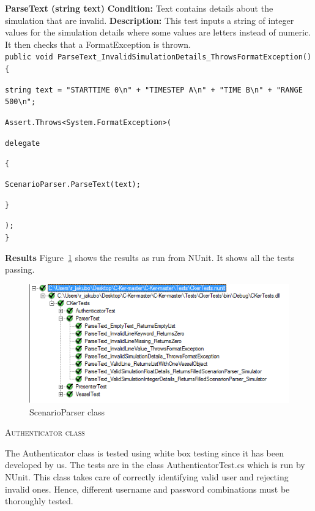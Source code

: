 \documentclass[12pt]{article}
\begin{document}
\clearpage

{\bfseries ParseText (string text)} \newline
{\bfseries Condition:} Text contains details about the simulation that are invalid. \newline
{\bfseries Description:} This test inputs a string of integer values for the simulation details where some values are letters instead of numeric. It then checks that a FormatException is thrown.\\

\texttt{public void ParseText\_InvalidSimulationDetails\_ThrowsFormatException()}\\
\texttt{\{}\par
\texttt{string text = "STARTTIME 0\textbackslash n" + "TIMESTEP A\textbackslash n" + "TIME B\textbackslash n" + "RANGE 500\textbackslash n";}\par
\texttt{Assert.Throws<System.FormatException>(}\par
\texttt{delegate}\par     
\texttt{\{}\par
\texttt{ScenarioParser.ParseText(text);}\par
\texttt{\}}\par
\texttt{);}\\
\texttt{\}}\par

\clearpage

{\bfseries Results} \newline
Figure~\ref{fig:ScenarioParser class} shows the results as run from NUnit. It shows all the tests passing.
\begin{figure}[h!]
    \centering
    \includegraphics[scale=0.8]{ScenarioParser_class}
    \caption{ScenarioParser class}
    \label{fig:ScenarioParser class}
\end{figure}



\centerline{\textsc{Authenticator class}}
\vspace*{0.2in}
The Authenticator class is tested using white box testing since it has been developed by us. The tests are in the class AuthenticatorTest.cs which is run by NUnit. This class takes care of correctly identifying valid user and rejecting invalid ones. Hence, different username and password combinations must be thoroughly tested.\\
\end{document}
